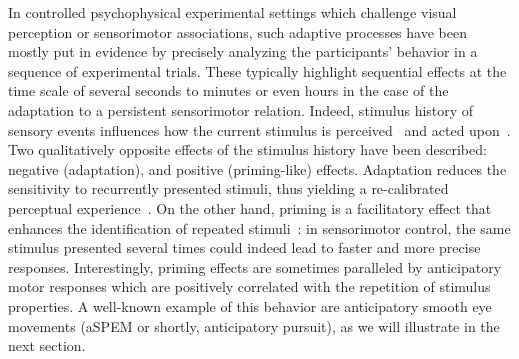 \documentclass[10pt,letterpaper]{article}
\newcommand{\citep}[1]{\cite{#1}}
\newcommand{\Rone}[1]{\textbf{\textcolor{magenta}{[rev 1: #1]}}}
\newcommand{\AM}[1]{\textbf{\textcolor{blue}{[AM: #1]}}}
\begin{document}
In controlled psychophysical experimental settings which challenge visual perception or sensorimotor associations,
such adaptive processes have been mostly put in evidence
by precisely analyzing the participants' behavior in a sequence of experimental trials.
These typically highlight sequential effects
at the time scale of several seconds to minutes
or even hours in the case of the adaptation to a persistent sensorimotor relation.
Indeed, stimulus history of sensory events influences
how the current stimulus is perceived~\citep{Sotiropoulos2011,Adams12,ChopinMamassian2012,FischerWhitney2014,Cicchini_PRSB_2018} and
acted upon~\citep{WallmanFuchs1998,Carpenter1995, Maus2015,Damasse18}.
Two qualitatively opposite effects of the stimulus history have been described:
negative (adaptation), and positive (priming-like) effects.
Adaptation reduces the sensitivity to recurrently presented stimuli,
thus yielding a re-calibrated perceptual experience~\citep{Clifford2007, Webster2011, Kohn2007}.
On the other hand, priming is a facilitatory effect that
enhances the identification of repeated stimuli~\citep{Verstraten1994, Tiest2009}:
in sensorimotor control,
the same stimulus presented several times could indeed
lead to faster and more precise responses.
Interestingly, priming effects %
are sometimes paralleled by anticipatory motor responses
which are positively correlated with the repetition of stimulus properties.
A well-known example of this behavior
are anticipatory smooth eye movements (aSPEM or shortly, anticipatory pursuit),
as we will illustrate in the next section.
\end{document}

